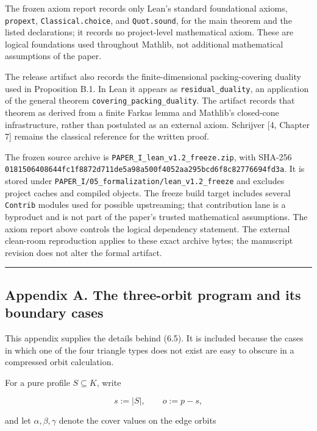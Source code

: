 \documentclass[
  american,
  11pt,
  a4paper,
]{article}
\begin{document}
The frozen axiom report records only Lean's standard foundational axioms, \texttt{propext}, \texttt{Classical.choice}, and \texttt{Quot.sound}, for the main theorem and the listed declarations; it records no project-level mathematical axiom. These are logical foundations used throughout Mathlib, not additional mathematical assumptions of the paper.

The release artifact also records the finite-dimensional packing-covering duality used in Proposition B.1. In Lean it appears as \texttt{residual\_duality}, an application of the general theorem \texttt{covering\_packing\_duality}. The artifact records that theorem as derived from a finite Farkas lemma and Mathlib's closed-cone infrastructure, rather than postulated as an external axiom. Schrijver {[}4, Chapter 7{]} remains the classical reference for the written proof.

The frozen source archive is \texttt{PAPER\_I\_lean\_v1.2\_freeze.zip}, with SHA-256 \texttt{0181506408644fc1f8872d711de5a98a500f4052aa295bcd6f8c82776694fd3a}. It is stored under \texttt{PAPER\_I/05\_formalization/lean\_v1.2\_freeze} and excludes project caches and compiled objects. The freeze build target includes several \texttt{Contrib} modules used for possible upstreaming; that contribution lane is a byproduct and is not part of the paper's trusted mathematical assumptions. The axiom report above controls the logical dependency statement. The external clean-room reproduction applies to these exact archive bytes; the manuscript revision does not alter the formal artifact.

\begin{center}\rule{0.5\linewidth}{0.5pt}\end{center}

\subsection{Appendix A. The three-orbit program and its boundary cases}\label{appendix-a.-the-three-orbit-program-and-its-boundary-cases}

This appendix supplies the details behind (6.5). It is included because the cases in which one of the four triangle types does not exist are easy to obscure in a compressed orbit calculation.

For a pure profile \(S\subseteq K\), write

\[
s:=|S|,
\qquad
o:=p-s,
\]

and let \(\alpha,\beta,\gamma\) denote the cover values on the edge orbits
\end{document}
